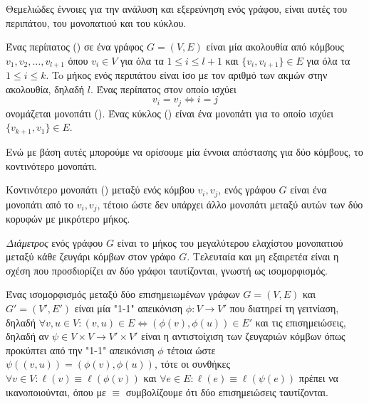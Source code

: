 Θεμελιώδες έννοιες για την ανάλυση και εξερεύνηση ενός γράφου, είναι αυτές του περιπάτου, του μονοπατιού και του κύκλου.
\begin{definition}
Ένας περίπατος () σε ένα γράφος $G = (V, E)$ είναι μία ακολουθία από κόμβους $v_{1}, v_{2}, \dots , v_{l + 1}$ όπου $v_{i} \in V$ για όλα τα $1 \leq i \leq l + 1$ και $\{ v_{i} , v_{i + 1} \} \in E$ για όλα τα
$1 \leq i \leq k$. To μήκος ενός περιπάτου είναι ίσο με τον αριθμό των ακμών στην ακολουθία, δηλαδή $l$.
Ένας περίπατος στον οποίο ισχύει $$v_{i} = v_{j} \Leftrightarrow i = j$$ ονομάζεται μονοπάτι ().
Ένας κύκλος () είναι ένα μονοπάτι για το οποίο ισχύει $\{v_{k + 1}, v_{1}\} \in E$.
\end{definition}
Ενώ με βάση αυτές μπορούμε να ορίσουμε μία έννοια απόστασης για δύο κόμβους, το κοντινότερο μονοπάτι.
\begin{definition}
Κοντινότερο μονοπάτι () μεταξύ ενός κόμβου $v_{i}, v_{j}$, ενός γράφου $G$ είναι ένα μονοπάτι από
το $v_{i}, v_{j}$, τέτοιο ώστε δεν υπάρχει άλλο μονοπάτι μεταξύ αυτών των δύο κορυφών με μικρότερο μήκος.
\end{definition}
\textit{Διάμετρος} ενός γράφου $G$ είναι το μήκος του μεγαλύτερου ελαχίστου μονοπατιού μεταξύ κάθε ζευγάρι κόμβων στον γράφο $G$.
Τελευταία και μη εξαιρετέα είναι η σχέση που προσδιορίζει αν δύο γράφοι ταυτίζονται, γνωστή ως ισομορφισμός.
\begin{definition}[Ισομορφισμός]
Ένας ισομορφισμός μεταξύ δύο επισημειωμένων γράφων $G=(V,E)$ και $G'=(V',E')$ είναι μία "1-1" απεικόνιση $\phi : V \rightarrow V'$ που διατηρεί τη γειτνίαση, δηλαδή $\forall v,u \in V : (v,u) \in E \Leftrightarrow (\phi(v), \phi(u)) \in E'$ και τις επισημειώσεις, δηλαδή αν $\psi \in V \times V \rightarrow V' \times V'$ είναι η αντιστοίχιση των ζευγαριών κόμβων όπως προκύπτει από την "1-1" απεικόνιση $\phi$ τέτοια ώστε $\psi((v,u)) = (\phi(v), \phi(u))$, τότε οι συνθήκες $\forall v \in V : \ell(v) \equiv \ell(\phi(v))$ και $\forall e \in E : \ell(e) \equiv \ell(\psi(e))$ πρέπει να ικανοποιούνται, όπου με $\equiv$ συμβολίζουμε ότι δύο επισημειώσεις ταυτίζονται.
\label{def:isomorphism}
\end{definition}
